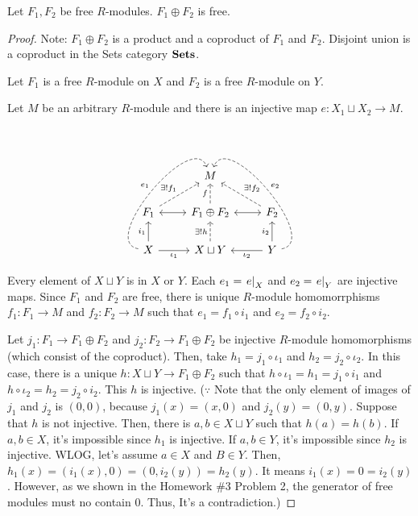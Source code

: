 \begin{lemma}\label{lem-prod-free}
  Let \(F_1, F_2\) be free \(R\)-modules. \(F_1 \oplus F_2\) is free.
\end{lemma}
\begin{proof}
  Note:
  \(F_1 \oplus F_2\) is a product and a coproduct of \(F_1\) and \(F_2\).
  Disjoint union is a coproduct in the Sets category \(\textbf{Sets}\).

  Let \(F_1\) is a free \(R\)-module on \(X\) and \(F_2\) is a free \(R\)-module on \(Y\).

  Let \(M\) be an arbitrary \(R\)-module and there is an injective map \(e: X_1 \sqcup X_2 \to M\).

  \[\begin{tikzcd}
    & M &
    \\ F_1 \ar[<->]{r} \ar[dashed, "\exists! f_1"]{ur}
    &  F_1 \oplus F_2 \ar[dashed, "f"]{u}
    &  F_2 \ar[<->]{l} \ar[dashed, swap, "\exists! f_2"]{ul}
    \\ X \ar["i_1"]{u} \ar[swap, "\iota_1"]{r} \ar[dashed, bend left=120, "e_1"]{uur}
    &  X \sqcup Y \ar[dashed, "\exists! h"]{u}
    &  Y \ar["i_2"]{u} \ar["\iota_2"]{l} \ar[dashed, bend right=120, swap, "e_2"]{uul}
  \end{tikzcd}\]

  Every element of \(X \sqcup Y\) is in \(X\) or \(Y\).
  Each \(e_1 = \left. e \right|_X\) and \(e_2 = \left. e \right|_Y\) are injective maps.
  Since \(F_1\) and \(F_2\) are free, there is unique \(R\)-module homomorrphisms \(f_1: F_1 \to M\) and \(f_2: F_2 \to M\)
  such that \(e_1 = f_1 \circ i_1\) and \(e_2 = f_2 \circ i_2\).

  Let \(j_1: F_1 \to F_1 \oplus F_2\) and \(j_2: F_2 \to F_1 \oplus F_2\)
  be injective \(R\)-module homomorphisms (which consist of the coproduct).
  Then, take \(h_1 = j_1 \circ \iota_1\) and \(h_2 = j_2 \circ \iota_2\).
  In this case, there is a unique \(h: X \sqcup Y \to F_1 \oplus F_2\)
  such that \(h \circ \iota_1 = h_1 = j_1 \circ i_1\)
  and \(h \circ \iota_2 = h_2 = j_2 \circ i_2\).
  This \(h\) is injective.
  (\(\because\) Note that the only element of images of \(j_1\) and \(j_2\) is \((0, 0)\), because \(j_1(x) = (x, 0)\) and \(j_2(y) = (0, y)\).
  Suppose that \(h\) is not injective.
  Then, there is \(a, b \in X \sqcup Y\)
  such that \(h(a) = h(b)\).
  If \(a, b \in X\), it's impossible since \(h_1\) is injective.
  If \(a, b \in Y\), it's impossible since \(h_2\) is injective.
  WLOG, let's assume \(a \in X\) and \(B \in Y\).
  Then, \(h_1(x) = (i_1(x), 0) = (0, i_2(y)) = h_2(y)\).
  It means \(i_1(x) = 0 = i_2(y)\).
  However, as we shown in the Homework \#3 Problem 2, the generator of free modules must no contain 0.
  Thus, It's a contradiction.)


\end{proof}
